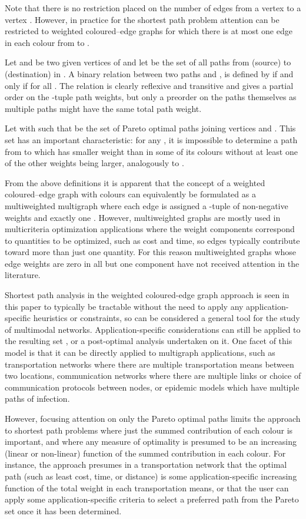 \documentclass[preprint,authoryear,12pt]{elsarticle}
\begin{document}
Note that there is no restriction placed on the number of edges
 from a vertex  to a vertex . However, in practice
for the shortest path problem attention can be restricted to
weighted coloured--edge graphs for which there is at most one edge
 in each colour from  to .

Let  and  be two given vertices of  and let
 be the set of all paths from  (source) to
 (destination) in . A binary relation between two paths 
and , is defined by  if and only if  for all . The relation  is clearly
reflexive and transitive and gives a partial order on the
-tuple path weights,
but only a preorder on the paths themselves as multiple paths might have
the same total path weight.

Let  with  such that  be the set of
Pareto optimal paths joining vertices  and . This set has an
important characteristic: for any , it is
impossible to determine a path  from  to  which has
smaller weight than  in some of its  colours without at least
one of the other weights being larger, analogously to \cite{List16}.

From the above definitions it is apparent that the concept of
a weighted coloured--edge graph with  colours can equivalently be formulated
as a multiweighted multigraph where each edge is assigned a -tuple of non-negative
weights  and exactly one .
However, multiweighted graphs are mostly used in multicriteria optimization applications
where the weight components correspond to quantities to be optimized, such as cost and time,
so edges typically contribute toward more than just one quantity.
For this reason multiweighted graphs whose edge weights are zero in all but one component
have not received attention in the literature.


Shortest path analysis in the weighted coloured-edge graph approach
is seen in this paper to typically be tractable without the need
to apply any application-specific heuristics or constraints,
so can be considered a general tool for the study of multimodal networks.
Application-specific considerations can still be applied to the
resulting set , or a post-optimal analysis undertaken on it.
One facet of this model is that it can be directly applied to
multigraph applications, such as transportation networks where there are multiple
transportation means between two locations, communication networks where there
are multiple links or choice of communication protocols between nodes,
or epidemic models which have multiple paths of infection.

However, focusing attention on only the Pareto optimal paths limits the approach to
shortest path problems where just the summed contribution of each colour
is important, and where any measure of optimality is presumed to be
an increasing (linear or non-linear) function of the summed contribution
in each colour.
For instance, the approach presumes in a transportation network that
the optimal path (such as least cost, time, or distance)
is some application-specific increasing function of the total weight
in each transportation means, or that the user can apply some application-specific
criteria to select a preferred path from the Pareto set once it has been determined.
\end{document}

